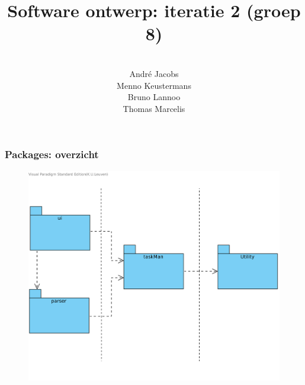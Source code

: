 \documentclass{beamer}
\title[Software ontwerp: iteratie 2]{Software ontwerp: iteratie 2 (groep 8)} %
\author[Groep 8]{\\
        Andr\'e Jacobs \\
        Menno Keustermans\\
        Bruno Lannoo \\
        Thomas Marcelis} %
\institute[KULeuven] %
{\\ %
\medskip
\textit{} %
}
\date{} %
\begin{document}
\begin{frame}
\titlepage %
\end{frame}



%       

\begin{frame}
\frametitle {Packages: overzicht}
\begin{figure}
\begin{center}
\includegraphics[scale=0.8]{figures/Package_Diagram1}
\end{center}
\end{figure}
\end{frame}

%
%
%
\end{document}
